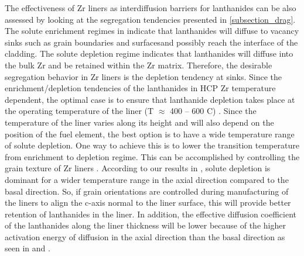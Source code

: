 \documentclass[preprint,12pt]{elsarticle}
\providecommand{\DIFadd}[1]{{\bf #1}} %
\providecommand{\DIFdel}[1]{} %
\providecommand{\DIFaddbegin}{\protect\color{blue}} %
\providecommand{\DIFaddend}{\protect\color{black}} %
\providecommand{\DIFdelbegin}{\protect\color{red}} %
\providecommand{\DIFdelend}{\protect\color{black}} %
\newcommand{\DIFscaledelfig}{0.5}
\newlength{\DIFdelgraphicswidth} %
\newlength{\DIFdelgraphicsheight} %
\newcommand{\DIFaddincludegraphics}[2][]{{\color{blue}\fbox{\DIFOincludegraphics[#1]{#2}}}} %
\newcommand{\DIFdelincludegraphics}[2][]{%
\sbox{\DIFdelgraphicsbox}{\DIFOincludegraphics[#1]{#2}}%
\settoboxwidth{\DIFdelgraphicswidth}{\DIFdelgraphicsbox} %
\settoboxtotalheight{\DIFdelgraphicsheight}{\DIFdelgraphicsbox} %
\scalebox{\DIFscaledelfig}{%
\parbox[b]{\DIFdelgraphicswidth}{\usebox{\DIFdelgraphicsbox}\\[-\baselineskip] \rule{\DIFdelgraphicswidth}{0em}}\llap{\resizebox{\DIFdelgraphicswidth}{\DIFdelgraphicsheight}{%
\setlength{\unitlength}{\DIFdelgraphicswidth}%
\begin{picture}(1,1)%
\thicklines\linethickness{2pt} %
{\color[rgb]{1,0,0}\put(0,0){\framebox(1,1){}}}%
{\color[rgb]{1,0,0}\put(0,0){\line( 1,1){1}}}%
{\color[rgb]{1,0,0}\put(0,1){\line(1,-1){1}}}%
\end{picture}%
}\hspace*{3pt}}} %
} %
\DeclareRobustCommand{\DIFaddbegin}{\DIFOaddbegin \let\includegraphics\DIFaddincludegraphics} %
\DeclareRobustCommand{\DIFaddend}{\DIFOaddend \let\includegraphics\DIFOincludegraphics} %
\DeclareRobustCommand{\DIFdelbegin}{\DIFOdelbegin \let\includegraphics\DIFdelincludegraphics} %
\DeclareRobustCommand{\DIFdelend}{\DIFOaddend \let\includegraphics\DIFOincludegraphics} %
\begin{document}
The effectiveness of Zr liners as interdiffusion barriers for lanthanides can be also assessed by looking at the segregation tendencies presented in \cref{subsection_drag}. The solute enrichment regimes in  \DIFdelbegin \DIFdel{and \Cref{fig:pdc_average} }\DIFdelend indicate that lanthanides will diffuse to vacancy sinks such as grain boundaries and surfaces\DIFaddbegin \DIFadd{, }\DIFaddend and possibly reach the interface of the cladding. The solute depletion regime indicates that lanthanides will diffuse into the bulk Zr and be retained within the Zr matrix. Therefore, the desirable segregation behavior in Zr liners is the depletion tendency at sinks.
Since the enrichment/depletion tendencies of the lanthanides in HCP Zr \DIFdelbegin \DIFdel{is }\DIFdelend \DIFaddbegin \DIFadd{are }\DIFaddend temperature dependent, the optimal case is to ensure that lanthanide depletion takes place at the operating temperature of the liner (T $\approx$ 400 -- 600 \DIFaddbegin \DIFadd{$^{\circ}$}\DIFaddend C) \cite{beausoleil_fast_2022}. Since the temperature of the liner varies along its height and will also depend on the position of the fuel element, the best option is to have a wide temperature range of solute depletion. One way to achieve this is to lower the transition temperature from enrichment to depletion regime. This can be accomplished by controlling the \DIFaddbegin \DIFadd{crystallographic }\DIFaddend grain texture of Zr liners \DIFaddbegin \DIFadd{while maintaining a large grain size to limit grain boundary diffusion}\DIFaddend . According to our results in , solute depletion is dominant for a wider temperature range in the axial direction compared to the basal direction. So, if grain orientations are controlled during manufacturing of the liners to align the c-axis normal to the liner surface, this will provide better retention of lanthanides in the liner. \DIFaddbegin \DIFadd{It should be noted that solute depletion does not mean that lanthanides will never reach the sinks. Solute segregation to grain boundaries due to a thermodynamic preference may still occur. However, controlling the crystallographic orientation of grains will increase the tendency of solutes to remain within the bulk. }\DIFaddend In addition, the effective diffusion coefficient of the lanthanides along the liner thickness will be lower because of the higher activation energy of diffusion in the axial direction than the basal direction as seen in  and .
\end{document}
